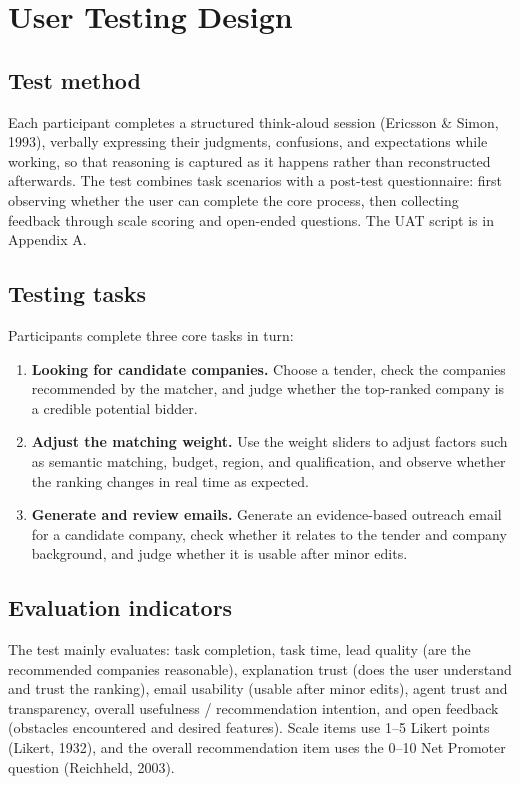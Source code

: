 \section{User Testing Design}

\subsection{Test method}
Each participant completes a structured think-aloud session (Ericsson \& Simon, 1993),
verbally expressing their judgments, confusions, and expectations while working, so
that reasoning is captured as it happens rather than reconstructed afterwards. The test
combines task scenarios with a
post-test questionnaire: first observing whether the user can complete the core
process, then collecting feedback through scale scoring and open-ended questions. The
UAT script is in Appendix A.

\subsection{Testing tasks}
Participants complete three core tasks in turn:

\begin{enumerate}
\tightlist
\item \textbf{Looking for candidate companies.} Choose a tender, check the companies
  recommended by the matcher, and judge whether the top-ranked company is a credible
  potential bidder.
\item \textbf{Adjust the matching weight.} Use the weight sliders to adjust factors
  such as semantic matching, budget, region, and qualification, and observe whether
  the ranking changes in real time as expected.
\item \textbf{Generate and review emails.} Generate an evidence-based outreach email
  for a candidate company, check whether it relates to the tender and company
  background, and judge whether it is usable after minor edits.
\end{enumerate}

\subsection{Evaluation indicators}
The test mainly evaluates: task completion, task time, lead quality (are the
recommended companies reasonable), explanation trust (does the user understand and
trust the ranking), email usability (usable after minor edits), agent trust and
transparency, overall usefulness / recommendation intention, and open feedback
(obstacles encountered and desired features). Scale items use 1--5 Likert points
(Likert, 1932), and the overall recommendation item uses the 0--10 Net Promoter
question (Reichheld, 2003).

